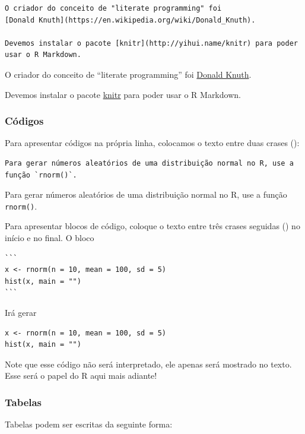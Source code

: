\documentclass[10pt,a4paper]{book}
\begin{document}
\begin{verbatim}
O criador do conceito de "literate programming" foi
[Donald Knuth](https://en.wikipedia.org/wiki/Donald_Knuth).

Devemos instalar o pacote [knitr](http://yihui.name/knitr) para poder
usar o R Markdown.
\end{verbatim}

O criador do conceito de ``literate programming'' foi
\href{https://en.wikipedia.org/wiki/Donald_Knuth}{Donald Knuth}.

Devemos instalar o pacote \href{http://yihui.name/knitr}{knitr} para
poder usar o R Markdown.

\subsubsection*{Códigos}\label{cuxf3digos}


Para apresentar códigos na própria linha, colocamos o texto entre duas
crases (\texttt{\textasciigrave{}}):

\begin{verbatim}
Para gerar números aleatórios de uma distribuição normal no R, use a
função `rnorm()`.
\end{verbatim}

Para gerar números aleatórios de uma distribuição normal no R, use a
função \texttt{rnorm()}.

Para apresentar blocos de código, coloque o texto entre três crases
seguidas (\texttt{\textasciigrave{}\textasciigrave{}\textasciigrave{}})
no início e no final. O bloco

\begin{verbatim}
```
x <- rnorm(n = 10, mean = 100, sd = 5)
hist(x, main = "")
```
\end{verbatim}

Irá gerar

\begin{verbatim}
x <- rnorm(n = 10, mean = 100, sd = 5)
hist(x, main = "")
\end{verbatim}

Note que esse código não será interpretado, ele apenas será mostrado no
texto. Esse será o papel do R aqui mais adiante!

\subsubsection*{Tabelas}\label{tabelas}


Tabelas podem ser escritas da seguinte forma:
\end{document}
